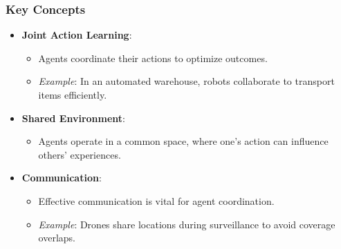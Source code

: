 \documentclass[aspectratio=169]{beamer}
\begin{document}
\begin{frame}[fragile]
    \frametitle{Key Concepts}
    \begin{itemize}
        \item \textbf{Joint Action Learning}:
            \begin{itemize}
                \item Agents coordinate their actions to optimize outcomes.
                \item \textit{Example}: In an automated warehouse, robots collaborate to transport items efficiently.
            \end{itemize}
        
        \item \textbf{Shared Environment}:
            \begin{itemize}
                \item Agents operate in a common space, where one's action can influence others' experiences.
            \end{itemize}
        
        \item \textbf{Communication}:
            \begin{itemize}
                \item Effective communication is vital for agent coordination.
                \item \textit{Example}: Drones share locations during surveillance to avoid coverage overlaps.
            \end{itemize}
    \end{itemize}
\end{frame}
\end{document}
